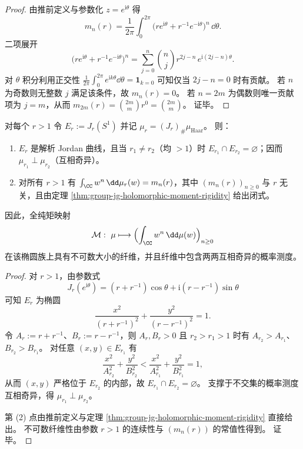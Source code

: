 \begin{proof}
由推前定义与参数化 \(z=e^{\mathrm{i}\theta}\) 得
\[
m_n(r)=\frac1{2\pi}\int_0^{2\pi}\bigl(r e^{\mathrm{i}\theta}+r^{-1}e^{-\mathrm{i}\theta}\bigr)^n\,\dd\theta.
\]
二项展开
\[
\bigl(r e^{\mathrm{i}\theta}+r^{-1}e^{-\mathrm{i}\theta}\bigr)^n
=\sum_{j=0}^{n}\binom{n}{j} r^{2j-n}\,e^{\mathrm{i}(2j-n)\theta}.
\]
对 \(\theta\) 积分利用正交性
\(
\frac1{2\pi}\int_0^{2\pi}e^{\mathrm{i}k\theta}\dd\theta=\mathbf{1}_{k=0}
\)
可知仅当 \(2j-n=0\) 时有贡献。
若 \(n\) 为奇数则无整数 \(j\) 满足该条件，故 \(m_n(r)=0\)。
若 \(n=2m\) 为偶数则唯一贡献项为 \(j=m\)，从而
\(
m_{2m}(r)=\binom{2m}{m}r^{0}=\binom{2m}{m}
\)。
证毕。
\end{proof}

\begin{theorem}[全纯矩映射在共焦椭圆曲线族上的非单射性]\label{thm:group-jg-holomorphic-moment-noninvertibility-ellipse-family}
对每个 \(r>1\) 令 \(E_r:=J_r(S^1)\) 并记 \(\mu_r=(J_r)_\#\mu_{\mathrm{Haar}}\)。
则：
\begin{enumerate}
  \item \(E_r\) 是解析 Jordan 曲线，且当 \(r_1\neq r_2\)（均 \(>1\)）时 \(E_{r_1}\cap E_{r_2}=\varnothing\)；因而 \(\mu_{r_1}\perp\mu_{r_2}\)（互相奇异）。
  \item 对所有 \(r>1\) 有 \(\int_{\CC} w^n\,\dd\mu_r(w)=m_n(r)\)，其中 \((m_n(r))_{n\ge 0}\) 与 \(r\) 无关，且由定理 \ref{thm:group-jg-holomorphic-moment-rigidity} 给出闭式。
\end{enumerate}
因此，全纯矩映射
\[
\mathcal{M}:\ \mu\longmapsto \Bigl(\int_{\CC} w^n\,\dd\mu(w)\Bigr)_{n\ge 0}
\]
在该椭圆族上具有不可数大小的纤维，并且纤维中包含两两互相奇异的概率测度。
\end{theorem}

\begin{proof}
对 \(r>1\)，由参数式
\[
J_r(e^{\mathrm{i}\theta})=(r+r^{-1})\cos\theta+\mathrm{i}(r-r^{-1})\sin\theta
\]
可知 \(E_r\) 为椭圆
\[
\frac{x^2}{(r+r^{-1})^2}+\frac{y^2}{(r-r^{-1})^2}=1.
\]
令 \(A_r:=r+r^{-1}\)、\(B_r:=r-r^{-1}\)，则 \(A_r,B_r>0\) 且 \(r_2>r_1>1\) 时有 \(A_{r_2}>A_{r_1}\)、\(B_{r_2}>B_{r_1}\)。
对任意 \((x,y)\in E_{r_1}\) 有
\[
\frac{x^2}{A_{r_2}^2}+\frac{y^2}{B_{r_2}^2}
<
\frac{x^2}{A_{r_1}^2}+\frac{y^2}{B_{r_1}^2}=1,
\]
从而 \((x,y)\) 严格位于 \(E_{r_2}\) 的内部，故 \(E_{r_1}\cap E_{r_2}=\varnothing\)。
支撑于不交集的概率测度互相奇异，得 \(\mu_{r_1}\perp\mu_{r_2}\)。
\par
第 (2) 点由推前定义与定理 \ref{thm:group-jg-holomorphic-moment-rigidity} 直接给出。
不可数纤维性由参数 \(r>1\) 的连续性与 \((m_n(r))\) 的常值性得到。
证毕。
\end{proof}

